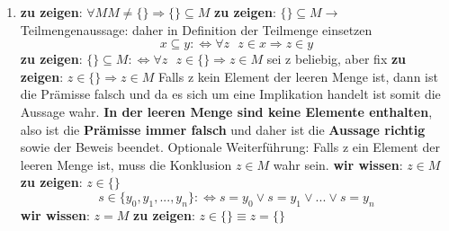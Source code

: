 \documentclass[a4paper]{article}
\begin{document}
\begin{enumerate}
		\item
		\textbf{zu zeigen}: $\forall M M \neq \{\} \Rightarrow \{\} \subseteq M$
		\newline
		\textbf{zu zeigen}: $\{\} \subseteq M \rightarrow$ Teilmengenaussage: daher in Definition der Teilmenge einsetzen
		\begin{equation*}
			x \subseteq y : \Leftrightarrow \forall z \text{ } z \in x \Rightarrow z \in y
		\end{equation*}
		\textbf{zu zeigen}: $\{\} \subseteq M :\Leftrightarrow \forall z \text{ } z \in \{\} \Rightarrow z \in M$
		\newline
		sei z beliebig, aber fix
		\newline
		\textbf{zu zeigen}: $z \in \{\} \Rightarrow z \in M$
		\newline
		Falls z kein Element der leeren Menge ist, dann ist die Prämisse falsch und da es sich um eine Implikation handelt ist somit die Aussage wahr.
		\newline
		\textbf{In der leeren Menge sind keine Elemente enthalten}, also ist die \textbf{Prämisse immer falsch} und daher ist die \textbf{Aussage richtig} sowie der Beweis beendet.
		\newline		
		\newline
		Optionale Weiterführung:
		\newline
		Falls z ein Element der leeren Menge ist, muss die Konklusion $z \in M$ wahr sein.
		\newline
		\textbf{wir wissen}: $z \in M$
		\newline
		\textbf{zu zeigen}: $z \in \{\}$
		\begin{equation*}
			s \in \{y_{0}, y_{1}, ..., y_{n}\} :\Leftrightarrow s = y_{0} \lor s = y_{1} \lor ... \lor s = y_{n}
		\end{equation*}
		\textbf{wir wissen}: $z = M$
		\newline
		\textbf{zu zeigen}: $z \in \{\} \equiv z = \{\}$
	\end{enumerate}
\end{document}
